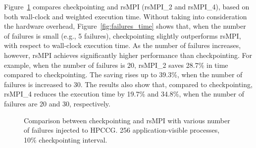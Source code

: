 Figure~\ref{fig:multiple_failure} compares checkpointing and rsMPI (rsMPI\_2 and rsMPI\_4), based on both wall-clock and weighted execution time. Without taking into consideration the hardware overhead, Figure~\ref{fig:failures_time} shows that, when the number of failures is small (e.g., 5 failures), checkpointing slightly outperforms rsMPI,  with respect to wall-clock execution time. As the number of failures increases, however, rsMPI achieves significantly higher performance than checkpointing. For example, when the number of failures is 20, rsMPI\_2 saves 28.7\% in time compared to checkpointing. The saving rises up to 39.3\%, when the number of failures is increased to $30$. The results also show that, compared to checkpointing, rsMPI\_4 reduces the execution time by 19.7\% and 34.8\%, when the number of failures are 20 and 30, respectively. 

\begin{figure}[!t]
  \begin{center}
  \end{center}
  \caption{Comparison between checkpointing and rsMPI with various number of failures injected to HPCCG. 256 application-visible processes, 10\% checkpointing interval.}

  \label{fig:multiple_failure}
\end{figure}


